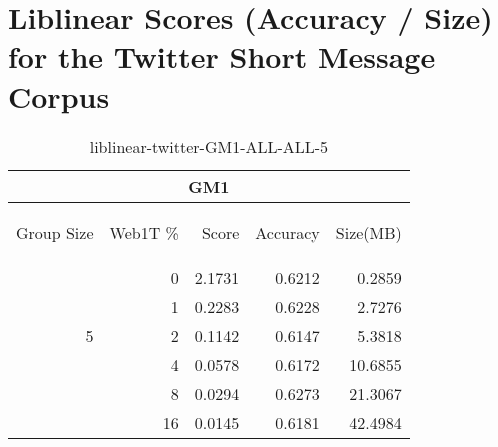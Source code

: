 \chapter{Liblinear Scores (Accuracy / Size) for the Twitter Short Message Corpus}

\begin{center}
\begin{table}[htbp]
\begin{tabular}{ | r | r | r | r | r |}
\hline
\multicolumn{5}{|c|}{GM1}\\
\hline
\begin{sideways}Group Size\end{sideways} & \begin{sideways}Web1T \%\end{sideways} & \begin{sideways}Score\end{sideways} & \begin{sideways}Accuracy\end{sideways} & \begin{sideways}Size(MB)\end{sideways}\\
\hline
\multirow{5}{*}{5}
 & 0 & 2.1731 & 0.6212 & 0.2859\\ \cline{2-5}
 & 1 & 0.2283 & 0.6228 & 2.7276\\ \cline{2-5}
 & 2 & 0.1142 & 0.6147 & 5.3818\\ \cline{2-5}
 & 4 & 0.0578 & 0.6172 & 10.6855\\ \cline{2-5}
 & 8 & 0.0294 & 0.6273 & 21.3067\\ \cline{2-5}
 & 16 & 0.0145 & 0.6181 & 42.4984\\ \cline{2-5}
\hline
\end{tabular}
\caption{liblinear-twitter-GM1-ALL-ALL-5}
\label{table:liblinear-twitter-GM1-ALL-ALL-5}
\end{table}
\end{center}

